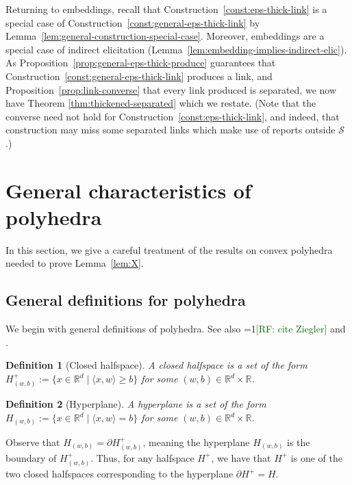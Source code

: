 \documentclass[11pt]{article}
\newcommand{\Comments}{1}
\newcommand{\mynote}[2]{\ifnum\Comments=1\textcolor{#1}{#2}\fi}
\newcommand{\raf}[1]{\mynote{darkgreen}{[RF: #1]}}
\newcommand{\reals}{\mathbb{R}}
\newcommand{\Sc}{\mathcal{S}}
\newcommand{\inprod}[2]{\langle #1, #2 \rangle}%
\newtheorem{definition}{Definition}
\begin{document}
Returning to embeddings, recall that Construction~\ref{const:eps-thick-link} is a special case of Construction~\ref{const:general-eps-thick-link} by Lemma~\ref{lem:general-construction-special-case}.
Moreover, embeddings are a special case of indirect elicitation (Lemma~\ref{lem:embedding-implies-indirect-elic}).
As Proposition~\ref{prop:general-eps-thick-produce} guarantees that Construction~\ref{const:general-eps-thick-link} produces a link, and Proposition~\ref{prop:link-converse} that every link produced is separated, we now have
Theorem \ref{thm:thickened-separated} which we restate.
(Note that the converse need not hold for Construction~\ref{const:eps-thick-link}, and indeed, that construction may miss some separated links which make use of reports outside $\Sc$.)
\thickenedseparated*

\section{General characteristics of polyhedra}
\label{app:polyhedra}

In this section, we give a careful treatment of the results on convex polyhedra needed to prove Lemma~\ref{lem:X}.

\subsection{General definitions for polyhedra}
\label{app:polyhedra:defs}

We begin with general definitions of polyhedra.
See also \raf{cite Ziegler} and \citet{gallier2008notes}.


\begin{definition}[Closed halfspace]
  A closed halfspace is a set of the form $H_{(w,b)}^+ := \{ x \in \reals^d \mid \inprod{x}{w} \geq b\}$ for some $(w,b) \in \reals^d \times \reals$.
\end{definition}
\begin{definition}[Hyperplane]
  A hyperplane is a set of the form $H_{(w,b)} := \{ x \in \reals^d \mid \inprod{x}{w} = b\}$ for some $(w,b)\in\reals^d \times \reals$.
\end{definition} 


Observe that $H_{(w,b)} = \partial H^+_{(w,b)}$, meaning the hyperplane $H_{(w,b)}$ is the boundary of $H^+_{(w,b)}$.
Thus, for any halfspace $H^+$, we have that $H^+$ is one of the two closed halfspaces corresponding to the hyperplane $\partial H^+ = H$.
\end{document}
